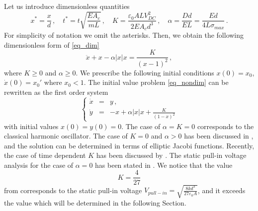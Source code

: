 \documentclass[review]{elsarticle}
\begin{document}
Let us introduce dimensionless quantities
\begin{equation}\label{eqn:less}
x^*=\frac{x}{d}\,,\quad t^*=t\sqrt{\frac{EA_c}{mL}}\,,\quad
K=\frac{\varepsilon_0 ALV_{DC}^2}{2EA_cd^3}\,,\quad \alpha=\frac{Dd}{EL}=\frac{Ed}{4L\sigma_{max}}\,.
\end{equation}
For simplicity of notation we omit the asterisks. Then, we obtain the following dimensionless form of \eqref{eq_dim}
\begin{equation}\label{eq_nondim}
\ddot{x}+x-\alpha |x|x = \frac{K}{(x-1)^2}\,,
\end{equation}
where $K\ge 0$ and $\alpha\ge 0$. We prescribe the following initial conditions $x(0)=x_0$, $\dot{x}(0)=x_0'$ where $x_0<1$. The initial value problem \eqref{eq_nondim} can be rewritten as the first order system
\begin{equation}
\label{first_order_system}
\left\{
\begin{array}{rcl}
\dot{x} & = & y\,,\\
\dot{y} & = & -x+\alpha |x|x+\frac{K}{(1-x)^2}
\end{array}
\right.
\end{equation}
with initial values $x(0)=y(0)=0$.
The case of $\alpha=K=0$ corresponds to the classical harmonic oscillator. The case of $K=0$ and $\alpha>0$ has been discussed in \cite{Cveticanin}, and the solution can be determined in terms of elliptic Jacobi functions.
 Recently, the case of time dependent $K$ has been discussed by \cite{Torres}. The static pull-in voltage analysis for the case of $\alpha=0$ has been stated in \cite{Younis}. We notice that the value
\[
K=\frac{4}{27}
\]
from \cite{Younis} corresponds to the static pull-in voltage $V_{pull-in}=\sqrt{\frac{8kd^3}{27\varepsilon_0 A}}$, and it exceeds the value which will be determined in the following Section.\\
\end{document}
